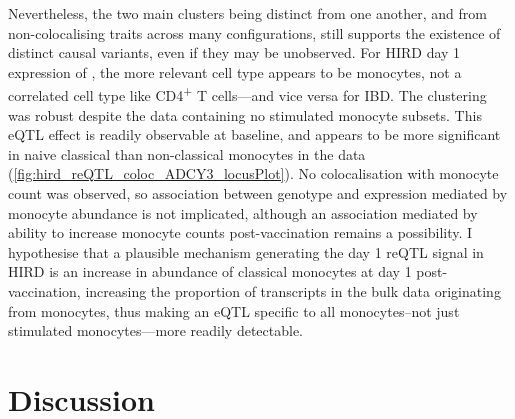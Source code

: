 Nevertheless, the two main clusters being distinct from one another, and from non-colocalising traits across many configurations,
still supports the existence of distinct causal variants, even if they may be unobserved.
For \gls{HIRD} day 1 expression of , the more relevant cell type appears to be monocytes, not a correlated cell type like CD4\textsuperscript{+} T cells---and vice versa for \gls{IBD}.
The clustering was robust despite the data containing no stimulated monocyte subsets.
This \gls{eQTL} effect is readily observable at baseline, and appears to be more significant in naive classical than non-classical monocytes in the \autocite{schmiedel2018ImpactGeneticPolymorphisms} data (\cref{fig:hird_reQTL_coloc_ADCY3_locusPlot}).
No colocalisation with monocyte count was observed, so association between genotype and  expression mediated by monocyte abundance is not implicated, 
although an association mediated by ability to increase monocyte counts post-vaccination remains a possibility.
I hypothesise that a plausible mechanism generating the day 1 \gls{reQTL} signal in \gls{HIRD}
is an increase in abundance of classical monocytes at day 1 post-vaccination,
increasing the proportion of  transcripts in the bulk data originating from monocytes,
thus making an \gls{eQTL} specific to all monocytes--not just stimulated monocytes---more readily detectable.

\section{Discussion}

